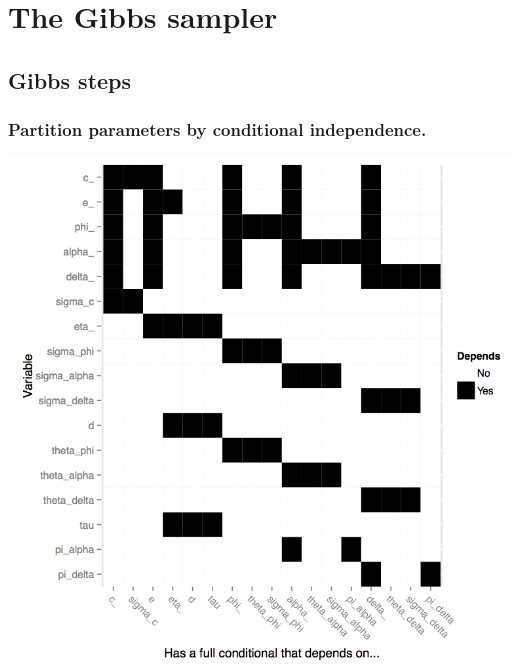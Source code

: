 \documentclass[handout]{beamer}
\numberwithin{equation}{section}
\begin{document}
\section{The Gibbs sampler}

\subsection{Gibbs steps}

\begin{frame}
\frametitle{Partition parameters by conditional independence.}
\begin{center}
\includegraphics[scale=.25]{fig/depend.png}
\end{center}
\end{frame}
\end{document}
